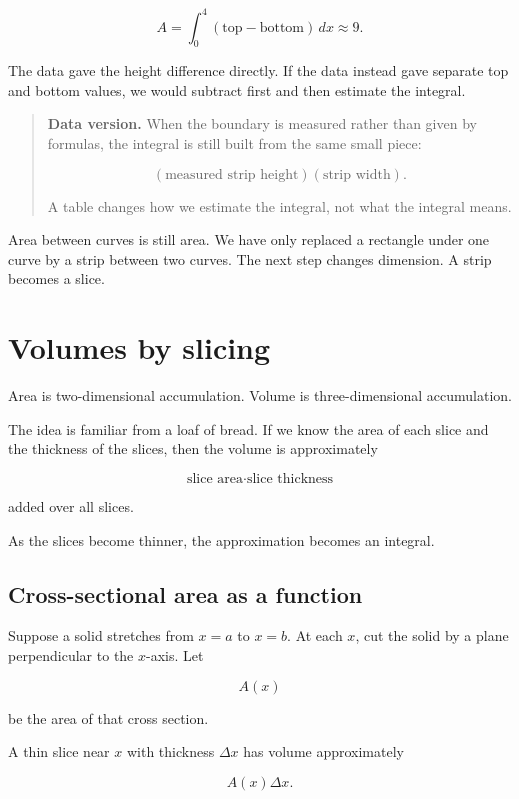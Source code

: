 \[
A=\int_0^4 (\text{top}-\text{bottom})\,dx
\approx 9.
\]

The data gave the height difference directly.  If the data instead gave separate top and
bottom values, we would subtract first and then estimate the integral.

\begin{quote}
\textbf{Data version.}
When the boundary is measured rather than given by formulas, the integral is still built
from the same small piece:

\[
(\text{measured strip height})(\text{strip width}).
\]

A table changes how we estimate the integral, not what the integral means.
\end{quote}

Area between curves is still area.  We have only replaced a rectangle under one curve
by a strip between two curves.  The next step changes dimension.  A strip becomes a
slice.

\section{Volumes by slicing}
\label{sec:volumes-by-slicing}

Area is two-dimensional accumulation.  Volume is three-dimensional accumulation.

The idea is familiar from a loaf of bread.  If we know the area of each slice and the
thickness of the slices, then the volume is approximately

\[
\text{slice area}\cdot\text{slice thickness}
\]

added over all slices.

As the slices become thinner, the approximation becomes an integral.

\subsection{Cross-sectional area as a function}
\label{subsec:cross-sectional-area-function}

Suppose a solid stretches from \(x=a\) to \(x=b\).  At each \(x\), cut the solid by a plane
perpendicular to the \(x\)-axis.  Let

\[
A(x)
\]

be the area of that cross section.

A thin slice near \(x\) with thickness \(\Delta x\) has volume approximately

\[
A(x)\Delta x.
\]

